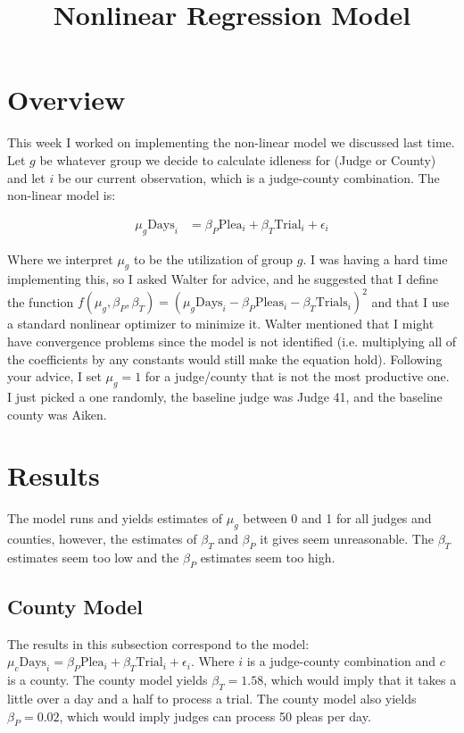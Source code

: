\documentclass[11pt]{article}
\title{Nonlinear Regression Model}
\begin{document}
\maketitle

\section{Overview}
  This week I worked on implementing the non-linear model we discussed last time. Let $g$ be whatever group we decide to calculate idleness for (Judge or County) and let $i$ be our current observation, which is a judge-county combination. The non-linear model is:

  \begin{align*}
    \mu_g \text{Days}_i &= \beta_P \text{Plea}_i + \beta_T \text{Trial}_i + \epsilon_i
  \end{align*}

  Where we interpret $\mu_g$ to be the utilization of group $g$. I was having a hard time implementing this, so I asked Walter for advice, and he suggested that I define the function $f(\mu_g,\beta_P,\beta_T) = (\mu_g \text{Days}_i - \beta_P \text{Pleas}_i - \beta_T \text{Trials}_i)^2$ and that I use a standard nonlinear optimizer to minimize it. Walter mentioned that I might have convergence problems since the model is not identified (i.e. multiplying all of the coefficients by any constants would still make the equation hold). Following your advice, I set $\mu_g=1$ for a judge/county that is not the most productive one. I just picked a one randomly, the baseline judge was Judge 41, and the baseline county was Aiken.

\section{Results}
  The model runs and yields estimates of $\mu_g$ between 0 and 1 for all judges and counties, however, the estimates of $\beta_T$ and $\beta_P$ it gives seem unreasonable. The $\beta_T$ estimates seem too low and the $\beta_P$ estimates seem too high.

  \subsection{County Model}
    The results in this subsection correspond to the model: $\mu_c \text{Days}_i = \beta_P \text{Plea}_i + \beta_T \text{Trial}_i + \epsilon_i$. Where $i$ is a judge-county combination and $c$ is a county. The county model yields $\beta_T=1.58$, which would imply that it takes a little over a day and a half to process a trial. The county model also yields $\beta_P=0.02$, which would imply judges can process 50 pleas per day.
\end{document}
